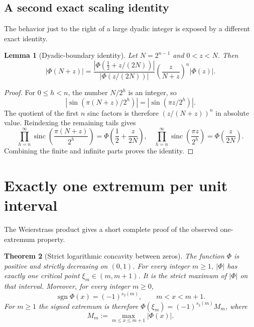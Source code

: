 \documentclass[11pt,oneside]{article}
\newtheorem{theorem}{Theorem}[section]
\newtheorem{lemma}[theorem]{Lemma}
\theoremstyle{definition}
\theoremstyle{remark}
\newcommand{\sinc}{\operatorname{sinc}}
\newcommand{\Phiup}{\Phi}
\newcommand{\sgn}{\operatorname{sgn}}
\newcommand{\abs}[1]{\left|#1\right|}
\begin{document}
\subsection{A second exact scaling identity}
\label{subsec:boundary-identity}

The behavior just to the right of a large dyadic integer is exposed by a different exact
identity.

\begin{lemma}[Dyadic-boundary identity]
\label{lem:dyadic-boundary}
Let $N=2^{n-1}$ and $0<z<N$.  Then
\begin{equation}
 \abs{\Phiup(N+z)}
 =\frac{\abs{\Phiup(\tfrac12+z/(2N))}}
        {\abs{\Phiup(z/(2N))}}
  \left(\frac{z}{N+z}\right)^n\abs{\Phiup(z)}.
 \label{eq:dyadic-boundary}
\end{equation}
\end{lemma}

\begin{proof}
For $0\le h<n$, the number $N/2^h$ is an integer, so
\[
 \abs{\sin(\pi(N+z)/2^h)}=\abs{\sin(\pi z/2^h)}.
\]
The quotient of the first $n$ sinc factors is therefore $(z/(N+z))^n$ in absolute value.
Reindexing the remaining tails gives
\[
 \prod_{h=n}^{\infty}\sinc\!\left(\frac{\pi(N+z)}{2^h}\right)
 =\Phiup\!\left(\frac12+\frac{z}{2N}\right),
 \quad
 \prod_{h=n}^{\infty}\sinc\!\left(\frac{\pi z}{2^h}\right)
 =\Phiup\!\left(\frac{z}{2N}\right).
\]
Combining the finite and infinite parts proves the identity.
\end{proof}

\section{Exactly one extremum per unit interval}
\label{sec:extrema}

The Weierstrass product gives a short complete proof of the observed one-extremum property.

\begin{theorem}[Strict logarithmic concavity between zeros]
\label{thm:unique-extremum}
The function $\Phiup$ is positive and strictly decreasing on $(0,1)$.  For every integer
$m\ge1$, $\abs{\Phiup}$ has exactly one critical point
$\xi_m\in(m,m+1)$.  It is the strict maximum of $\abs{\Phiup}$ on that interval.  Moreover,
for every integer $m\ge0$,
\begin{equation}
 \sgn\Phiup(x)=(-1)^{s_2(m)},\qquad m<x<m+1.
 \label{eq:TM-sign}
\end{equation}
For $m\ge1$ the signed extremum is therefore
$\Phiup(\xi_m)=(-1)^{s_2(m)}M_m$, where
\[
 M_m:=\max_{m\le x\le m+1}\abs{\Phiup(x)}.
\]
\end{theorem}
\end{document}
